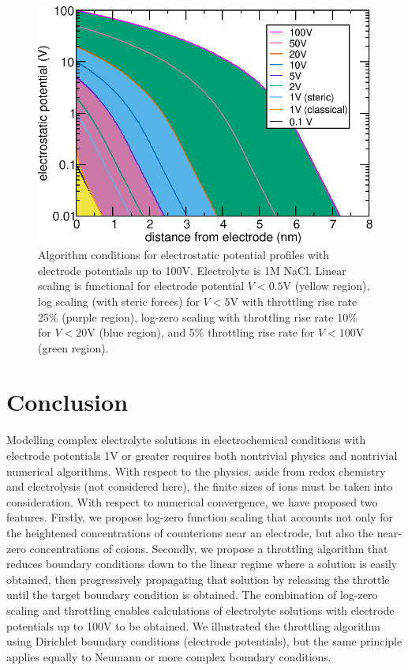 \begin{figure}
\centering
\includegraphics[width=0.9\linewidth]{graphics/counterion_potential_CS_bands.png}
\caption{\label{fig_all_potential_high} Algorithm conditions for
  electrostatic potential profiles with electrode potentials up to
  100V. Electrolyte is 1M NaCl. Linear scaling is functional for
  electrode potential $V<0.5$V (yellow region), log scaling (with
  steric forces) for $V<5$V with throttling rise rate 25\% (purple
  region), log-zero scaling with throttling rise rate 10\% for $V<20$V
  (blue region), and 5\% throttling rise rate for $V<100$V (green
  region).  }
\end{figure}

\section{Conclusion}

Modelling complex electrolyte solutions in electrochemical conditions
with electrode potentials 1V or greater requires both nontrivial
physics and nontrivial numerical algorithms. With respect to the
physics, aside from redox chemistry and electrolysis (not considered
here), the finite sizes of ions must be taken into consideration. With
respect to numerical convergence, we have proposed two
features. Firstly, we propose log-zero function scaling that accounts
not only for the heightened concentrations of counterions near an
electrode, but also the near-zero concentrations of coions. Secondly,
we propose a throttling algorithm that reduces boundary conditions
down to the linear regime where a solution is easily obtained, then
progressively propagating that solution by releasing the throttle
until the target boundary condition is obtained. The combination of
log-zero scaling and throttling enables calculations of electrolyte
solutions with electrode potentials up to 100V to be obtained. We
illustrated the throttling algorithm using Dirichlet boundary
conditions (electrode potentials), but the same principle applies
equally to Neumann or more complex boundary conditions.

